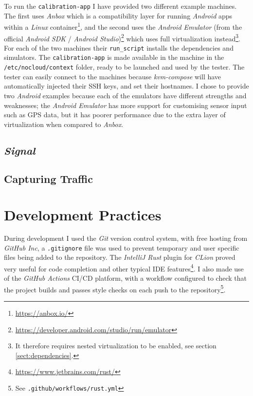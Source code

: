 \documentclass[
    author={Jacob Daniel Halsey},
    supervisor={Prof. Awais Rashid},
    degree={BSc},
    title={Building a Testbed for Evaluating Privacy Enhancing Technologies  (PETs)},
    subtitle={},
    type={software development},
    year={2021}
]{dissertation}
\begin{document}
To run the \texttt{calibration-app} I have provided two different example machines. The first
uses \emph{Anbox} which is a compatibility layer for running \emph{Android} apps within a \emph{Linux}
container\footnote{\url{https://anbox.io/}}, and the second uses the \emph{Android Emulator} 
(from the official \emph{Android SDK} / 
\emph{Android Studio})\footnote{\url{https://developer.android.com/studio/run/emulator}}
which uses full virtualization instead\footnote{It therefore requires nested 
virtualization to be enabled, see section \ref{sect:dependencies}.}.
For each of the two machines their \texttt{run\_script} installs the
dependencies and simulators. The \texttt{calibration-app} is made available in the machine in the 
\texttt{/etc/nocloud/context} folder, ready to be launched and used by the tester. The tester
can easily connect to the machines because \emph{kvm-compose} will have 
automatically injected their SSH keys, and set their hostnames.
I chose to provide two \emph{Android} examples because each of the emulators have different
strengths and weaknesses; the \emph{Android Emulator} has more support for customising sensor
input such as GPS data, but it has poorer performance due to the extra layer of virtualization
when compared to \emph{Anbox}.

\subsection{\emph{Signal}}

\subsection{Capturing Traffic}

\section{Development Practices}

During development I used the \emph{Git} version control system, with free hosting from \emph{GitHub Inc},
a \texttt{.gitignore} file was used to prevent temporary and user specific files being added to the
repository.
The \emph{IntelliJ Rust} plugin for \emph{CLion} proved very useful for code completion and other typical
IDE features\footnote{\url{https://www.jetbrains.com/rust/}}.
I also made use of the \emph{GitHub Actions} CI/CD platform, with a workflow configured to check that
the project builds and passes style checks on each push to the repository\footnote{See 
\texttt{.github/workflows/rust.yml}}. 
\end{document}
